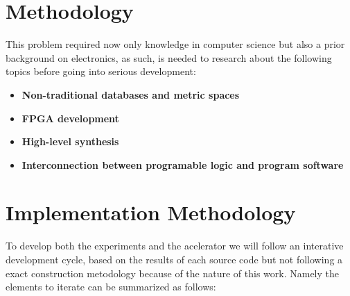 \section{Methodology}
This problem required now only knowledge in computer science but also a prior background on electronics, as such, is needed to 
research about the following topics before going into serious development:

\begin{itemize}
    \item {\textbf{Non-traditional databases and metric spaces}}
    \item {\textbf{FPGA development}}
    \item {\textbf{High-level synthesis}}
    \item {\textbf{Interconnection between programable logic and program software}}
\end{itemize}
\section{Implementation Methodology}
To develop both the experiments and the acelerator we will follow an interative development cycle, based on the results of each
source code but not following a exact construction metodology because of the nature of this work. Namely the elements to iterate 
can be summarized as follows:

